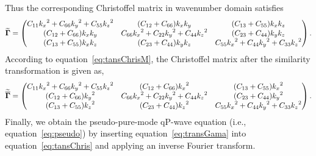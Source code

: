 Thus the corresponding Christoffel matrix in wavenumber domain satisfies
\begin{equation}
\widetilde{\mathbf{\Gamma}}=
 \begin{pmatrix} C_{11}{k_x}^2 + C_{66}{k_y}^2 + C_{55}{k_z}^2  & (C_{12}+C_{66}){k_x}{k_y} &(C_{13}+C_{55}){k_x}{k_z} \cr
         (C_{12}+C_{66}){k_x}{k_y} & C_{66}{k_x}^2+C_{22}{k_y}^2+C_{44}{k_z}^2 &(C_{23}+C_{44}){k_y}{k_z} \cr
         (C_{13}+C_{55}){k_x}{k_z} & (C_{23}+C_{44}){k_y}{k_z} & C_{55}{k_x}^2+C_{44}{k_y}^2+C_{33}{k_z}^2\end{pmatrix}.
\end{equation}
According to equation~\ref{eq:tansChrisM}, the Christoffel matrix after the similarity transformation is given as, 
\begin{equation}
\label{eq:transGama}
\widetilde{\overline{\mathbf{\Gamma}}}=
\begin{pmatrix} C_{11}{k_x}^2+C_{66}{k_y}^2+C_{55}{k_z}^2 &(C_{12}+C_{66}){k_x}^2 &(C_{13}+C_{55}){k_x}^2 \cr
         (C_{12}+C_{66}){k_y}^2 & C_{66}{k_x}^2+C_{22}{k_y}^2+C_{44}{k_z}^2 &(C_{23}+C_{44}){k_y}^2 \cr
         (C_{13}+C_{55}){k_z}^2 & (C_{23}+C_{44}){k_z}^2 & C_{55}{k_x}^2+C_{44}{k_y}^2+C_{33}{k_z}^2\end{pmatrix}.
\end{equation}
Finally, we obtain the pseudo-pure-mode qP-wave equation (i.e., equation~\ref{eq:pseudo})
by inserting equation~\ref{eq:transGama} into equation~\ref{eq:tansChris} and applying an
 inverse Fourier transform.


